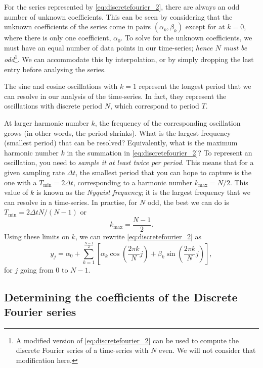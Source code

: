 \documentclass[11pt,twoside,a4paper]{article}
\begin{document}
For the series represented by \autoref{eq:discretefourier_2}, there
are always an odd number of unknown coefficients.  This can be seen by
considering that the unknown coefficients of the series come in pairs
$(\alpha_k,\beta_k)$ except for at $k=0$, where there is only one
coefficient, $\alpha_0$.  To solve for the unknown coefficients, we
must have an equal number of data points in our time-series;
\textit{hence $N$ must be odd}\footnote{A modified version of
  \autoref{eq:discretefourier_2} can be used to compute the discrete
  Fourier series of a time-series with $N$ even.  We will not consider
  that modification here.}.  We can accommodate this by interpolation,
or by simply dropping the last entry before analysing the series.

The sine and cosine oscillations with $k=1$ represent the longest
period that we can resolve in our analysis of the time-series.  In
fact, they represent the oscillations with discrete period $N$, which
correspond to period $T$.

At larger harmonic number $k$, the frequency of the corresponding
oscillation grows (in other words, the period shrinks).  What is the
largest frequency (smallest period) that can be resolved?
Equivalently, what is the maximum harmonic number $k$ in the summation
in \autoref{eq:discretefourier_2}? To represent an oscillation, you
need to \textit{sample it at least twice per period}.  This means that
for a given sampling rate $\Delta t$, the smallest period that you can
hope to capture is the one with a $T_\text{min}=2\Delta t$,
corresponding to a harmonic number $k_\text{max}=N/2$.  This value of
$k$ is known as the \textit{Nyquist frequency}; it is the largest
frequency that we can resolve in a time-series. In practise, for $N$
odd, the best we can do is $T_\text{min}=2\Delta t N/(N-1)$ or
\begin{displaymath}
  k_\text{max} = \frac{N-1}{2}.
\end{displaymath} 
Using these limits on $k$, we can rewrite
\autoref{eq:discretefourier_2} as
\begin{equation}
  \label{eq:discretefourier}
  y_j = \alpha_0 + \sum_{k=1}^{\frac{N-1}{2}}\left[ 
    \alpha_k\cos\left(\frac{2\pi k}{N}j\right) + 
    \beta_k\sin\left(\frac{2\pi k}{N}j\right)\right], 
\end{equation}
for $j$ going from 0 to $N-1$.

\subsection{Determining the coefficients of the Discrete Fourier series}
\end{document}
